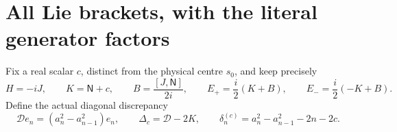 \documentclass[11pt]{article}
\begin{document}
\section{All Lie brackets, with the literal generator factors}

Fix a real scalar $c$, distinct from the physical centre $s_0$,
and keep precisely
\begin{equation}\label{swlie:eq:generators}
 H=-iJ,\qquad K=\mathsf N+c,\qquad
 B=\frac{[J,\mathsf N]}{2i},\qquad
 E_+=\frac i2(K+B),\qquad E_-=\frac i2(-K+B).
\end{equation}
Define the actual diagonal discrepancy
\begin{equation}\label{swlie:eq:delta}
 \mathcal D e_n=(a_n^2-a_{n-1}^2)e_n,\qquad
 \Delta_c=\mathcal D-2K,\qquad
 \delta_n^{(c)}=a_n^2-a_{n-1}^2-2n-2c.
\end{equation}
\end{document}
